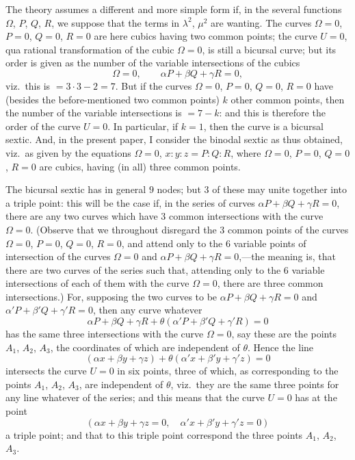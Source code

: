 \documentclass[11pt]{article}
\begin{document}
The theory assumes a different and more simple form if, in the several functions $\Omega$, $P$, $Q$, $R$, we suppose that the terms in $\lambda^2$, $\mu^2$ are wanting. The curves $\Omega = 0$, $P = 0$, $Q = 0$, $R = 0$ are here cubics having two common points; the curve $U = 0$, qua rational transformation of the cubic $\Omega = 0$, is still a bicursal curve; but its order is given as the number of the variable intersections of the cubics
\[
\Omega = 0,\qquad \alpha P + \beta Q + \gamma R = 0,
\]
viz.\ this is $= 3\cdot 3 - 2 = 7$. But if the curves $\Omega = 0$, $P = 0$, $Q = 0$, $R = 0$ have (besides the before-mentioned two common points) $k$ other common points, then the number of the variable intersections is $= 7 - k$: and this is therefore the order of the curve $U = 0$. In particular, if $k = 1$, then the curve is a bicursal sextic. And, in the present paper, I consider the binodal sextic as thus obtained, viz.\ as given by the equations $\Omega = 0$, $x : y : z = P : Q : R$, where $\Omega = 0$, $P = 0$, $Q = 0$, $R = 0$ are cubics, having (in all) three common points.

The bicursal sextic has in general $9$ nodes; but $3$ of these may unite together into a triple point: this will be the case if, in the series of curves $\alpha P + \beta Q + \gamma R = 0$, there are any two curves which have $3$ common intersections with the curve $\Omega = 0$. (Observe that we throughout disregard the $3$ common points of the curves $\Omega = 0$, $P = 0$, $Q = 0$, $R = 0$, and attend only to the $6$ variable points of intersection of the curves $\Omega = 0$ and $\alpha P + \beta Q + \gamma R = 0$,---the meaning is, that there are two curves of the series such that, attending only to the $6$ variable intersections of each of them with the curve $\Omega = 0$, there are three common intersections.) For, supposing the two curves to be $\alpha P + \beta Q + \gamma R = 0$ and $\alpha' P + \beta' Q + \gamma' R = 0$, then any curve whatever
\[
\alpha P + \beta Q + \gamma R + \theta(\alpha' P + \beta' Q + \gamma' R) = 0
\]
has the same three intersections with the curve $\Omega = 0$, say these are the points $A_1$, $A_2$, $A_3$, the coordinates of which are independent of $\theta$. Hence the line
\[
(\alpha x + \beta y + \gamma z) + \theta(\alpha' x + \beta' y + \gamma' z) = 0
\]
intersects the curve $U = 0$ in six points, three of which, as corresponding to the points $A_1$, $A_2$, $A_3$, are independent of $\theta$, viz.\ they are the same three points for any line whatever of the series; and this means that the curve $U = 0$ has at the point
\[
(\alpha x + \beta y + \gamma z = 0,\quad \alpha' x + \beta' y + \gamma' z = 0)
\]
a triple point; and that to this triple point correspond the three points $A_1$, $A_2$, $A_3$.
\end{document}
